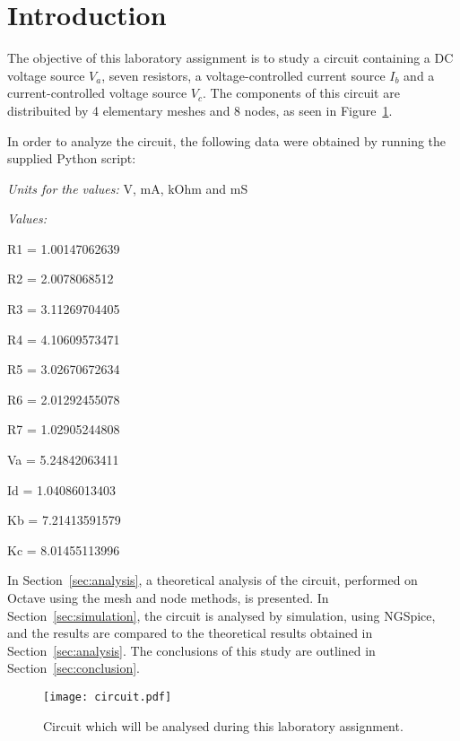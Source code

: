 \section{Introduction}
\label{sec:introduction}
The objective of this laboratory assignment is to study a circuit containing a
DC voltage source $V_a$, seven resistors, a voltage-controlled current source $I_b$ and
a current-controlled voltage source $V_c$. The components of this circuit are distribuited 
by 4 elementary meshes and 8 nodes, as seen in Figure~\ref{fig:circuit}.

In order to analyze the circuit, the following data were obtained by running the supplied Python script:

\textit{Units for the values:} V, mA, kOhm and mS

\textit{Values:} 

R1 = 1.00147062639\par
R2 = 2.0078068512\par
R3 = 3.11269704405\par
R4 = 4.10609573471\par
R5 = 3.02670672634\par
R6 = 2.01292455078\par
R7 = 1.02905244808\par
Va = 5.24842063411\par
Id = 1.04086013403\par
Kb = 7.21413591579\par
Kc = 8.01455113996


In Section~\ref{sec:analysis}, a theoretical analysis of the circuit, performed on Octave
using the mesh and node methods, is presented. In Section~\ref{sec:simulation}, the 
circuit is analysed by simulation, using NGSpice, and the results are compared to 
the theoretical results obtained in Section~\ref{sec:analysis}. The conclusions 
of this study are outlined in Section~\ref{sec:conclusion}.

\begin{figure}[H] \centering
\texttt{[image: circuit.pdf]}
\caption{Circuit which will be analysed during this laboratory assignment.}
\label{fig:circuit}
\end{figure}

